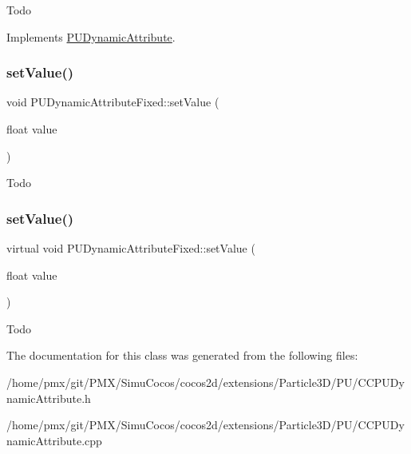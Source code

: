 Todo 

Implements \hyperlink{classPUDynamicAttribute_ac478ecb2528f32b536b1faa72558c756}{P\+U\+Dynamic\+Attribute}.

\mbox{\label{classPUDynamicAttributeFixed_a0b17d7e1e5d511153ff58714f300921e}} 
\subsubsection{\texorpdfstring{set\+Value()}{setValue()}\hspace{0.1cm}{\footnotesize\ttfamily [1/2]}}
{\footnotesize\ttfamily void P\+U\+Dynamic\+Attribute\+Fixed\+::set\+Value (\begin{DoxyParamCaption}\item[{float}]{value }\end{DoxyParamCaption})\hspace{0.3cm}{\ttfamily [virtual]}}

Todo \mbox{\label{classPUDynamicAttributeFixed_af0a889c5b77c876a52e005da2f1a9f41}} 
\subsubsection{\texorpdfstring{set\+Value()}{setValue()}\hspace{0.1cm}{\footnotesize\ttfamily [2/2]}}
{\footnotesize\ttfamily virtual void P\+U\+Dynamic\+Attribute\+Fixed\+::set\+Value (\begin{DoxyParamCaption}\item[{float}]{value }\end{DoxyParamCaption})\hspace{0.3cm}{\ttfamily [virtual]}}

Todo 

The documentation for this class was generated from the following files\+:\begin{DoxyCompactItemize}
\item 
/home/pmx/git/\+P\+M\+X/\+Simu\+Cocos/cocos2d/extensions/\+Particle3\+D/\+P\+U/C\+C\+P\+U\+Dynamic\+Attribute.\+h\item 
/home/pmx/git/\+P\+M\+X/\+Simu\+Cocos/cocos2d/extensions/\+Particle3\+D/\+P\+U/C\+C\+P\+U\+Dynamic\+Attribute.\+cpp\end{DoxyCompactItemize}
